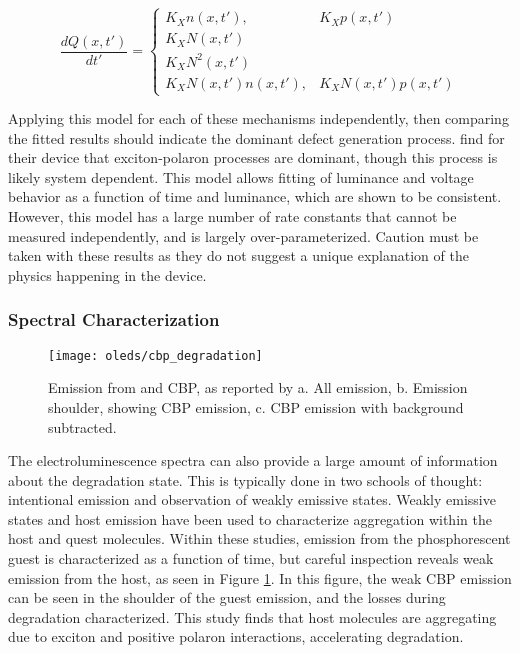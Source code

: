 \documentclass[../thesis.tex]{subfiles}
\begin{document}
\begin{equation}
\frac{dQ(x,t')}{dt'}=\left\{
\begin{array}{ll} K_X n(x,t'), & K_X p(x,t') \\  
K_XN(x,t') & \\
K_XN^2(x,t') & \\  
K_XN(x,t')n(x,t'), & K_XN(x,t')p(x,t') 
\end{array} \right.
\label{eqn:giebink_model_defects}
\end{equation}

Applying this model for each of these mechanisms independently, then comparing the fitted results should indicate the dominant defect generation process.
\textcite{Giebink2008a} find for their device that exciton-polaron processes are dominant, though this process is likely system dependent.
This model allows fitting of luminance and voltage behavior as a function of time and luminance, which are shown to be consistent.
However, this model has a large number of rate constants that cannot be measured independently, and is largely over-parameterized.  
Caution must be taken with these results as they do not suggest a unique explanation of the physics happening in the device.

\subsubsection{Spectral Characterization}

\begin{figure}[ht]
\centering
\texttt{[image: oleds/cbp\_degradation]}
\caption{Emission from \irppy and CBP, as reported by \textcite{Zhang2016} a. All emission, b. Emission shoulder, showing CBP emission, c. CBP emission with \irppy background subtracted.}
\label{fig:oleds_cbp}
\end{figure}

The electroluminescence spectra can also provide a large amount of information about the degradation state.\supercite{Scholz2015}
This is typically done in two schools of thought: intentional emission and observation of weakly emissive states.
Weakly emissive states and host emission have been used to characterize aggregation within the host and quest molecules.\supercite{Zhang2016,Wang2015a,Wang2014,Yu2017}
Within these studies, emission from the phosphorescent guest is characterized as a function of time, but careful inspection reveals weak emission from the host, as seen in Figure \ref{fig:oleds_cbp}.\supercite{Zhang2016}
In this figure, the weak CBP emission can be seen in the shoulder of the guest emission, and the losses during degradation characterized.
This study finds that host molecules are aggregating due to exciton and positive polaron interactions, accelerating degradation.
\end{document}
